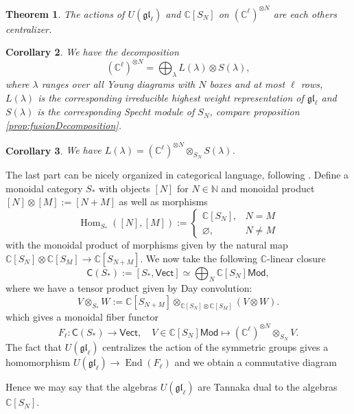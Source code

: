 \documentclass[11pt]{report}
\newtheorem{theorem}{Theorem}[section]
\newtheorem{corollary}[theorem]{Corollary}
\theoremstyle{definition}
\theoremstyle{remark}
\theoremstyle{remark}
\newcommand{\Hom}{\operatorname{Hom}}
\newcommand{\End}{\operatorname{End}}
\newcommand{\N}{\mathbb{N}}
\newcommand{\C}{\mathbb{C}}
\begin{document}
\begin{theorem}
The actions of $U(\mathfrak{gl}_\ell)$ and $\C[S_N]$ on $(\C^\ell)^{\otimes N}$ are each others centralizer.
\end{theorem}

\begin{corollary}
We have the decomposition
\begin{equation*}
(\C^\ell)^{\otimes N} = \bigoplus_{\lambda} L(\lambda) \otimes S(\lambda),
\end{equation*}
where $\lambda$ ranges over all Young diagrams with $N$ boxes and at most $\ell$ rows, $L(\lambda)$ is the corresponding irreducible highest weight representation of $\mathfrak{gl}_\ell$ and $S(\lambda)$ is the corresponding Specht module of $S_N$, compare proposition \ref{prop:fusionDecomposition}.
\end{corollary}

\begin{corollary}
We have $L(\lambda) = (\C^\ell)^{\otimes N} \otimes_{S_N} S(\lambda)$.
\end{corollary}

The last part can be nicely organized in categorical language, following \cite{article:davydov:2010}. Define a monoidal category $S_*$ with objects $[N]$ for $N \in \N$ and monoidal product $[N] \otimes [M] := [N+M]$ as well as morphisms
\begin{equation*}
\Hom_{S_*}([N],[M]) :=
\begin{cases}
\C[S_N], & N = M \\
\varnothing, & N \neq M
\end{cases}
\end{equation*}
with the monoidal product of morphisms given by the natural map $\C[S_N] \otimes \C[S_M] \to \C[S_{N+M}]$. We now take the following $\C$-linear closure
\begin{equation*}
\mathsf{C}(S_*) := [S_*,\mathsf{Vect}] \simeq \bigoplus_N \C[S_N]\mathsf{Mod},
\end{equation*}
where we have a tensor product given by Day convolution:
\begin{equation*}
V \otimes_{S_*} W := \C[S_{N+M}] \otimes_{\C[S_N] \otimes \C[S_M]} (V \otimes W).
\end{equation*}
which gives a monoidal fiber functor
\begin{equation*}
F_\ell: \mathsf{C}(S_*) \to \mathsf{Vect}, \quad V \in \C[S_N]\mathsf{Mod} \mapsto (\C^\ell)^{\otimes N} \otimes_{S_N} V.
\end{equation*}
The fact that $U(\mathfrak{gl}_\ell)$ centralizes the action of the symmetric groups gives a homomorphism $U(\mathfrak{gl}_\ell) \to \End(F_\ell)$ and we obtain a commutative diagram
\begin{center}
\end{center}
Hence we may say that the algebras $U(\mathfrak{gl}_\ell)$ are Tannaka dual to the algebras $\C[S_N]$.
\end{document}
